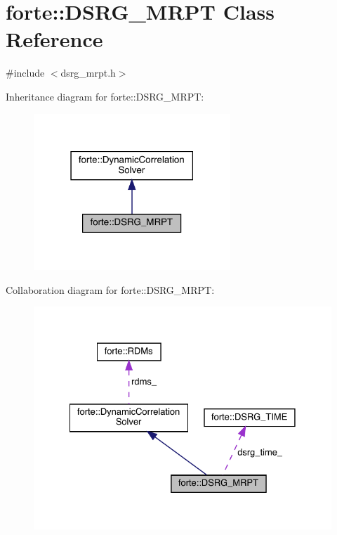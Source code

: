 \hypertarget{classforte_1_1_d_s_r_g___m_r_p_t}{}\section{forte\+:\+:D\+S\+R\+G\+\_\+\+M\+R\+PT Class Reference}
\label{classforte_1_1_d_s_r_g___m_r_p_t}


{\ttfamily \#include $<$dsrg\+\_\+mrpt.\+h$>$}



Inheritance diagram for forte\+:\+:D\+S\+R\+G\+\_\+\+M\+R\+PT\+:
\nopagebreak
\begin{figure}[H]
\begin{center}
\leavevmode
\includegraphics[width=210pt]{classforte_1_1_d_s_r_g___m_r_p_t__inherit__graph}
\end{center}
\end{figure}


Collaboration diagram for forte\+:\+:D\+S\+R\+G\+\_\+\+M\+R\+PT\+:
\nopagebreak
\begin{figure}[H]
\begin{center}
\leavevmode
\includegraphics[width=328pt]{classforte_1_1_d_s_r_g___m_r_p_t__coll__graph}
\end{center}
\end{figure}
